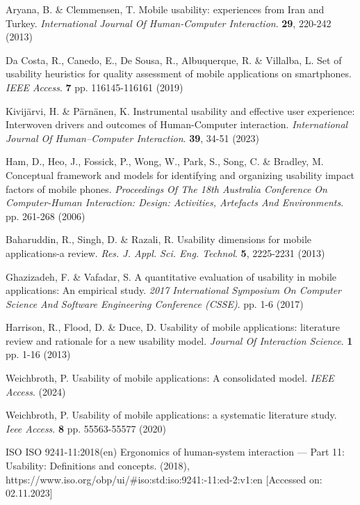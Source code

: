 \documentclass[preprint,12pt]{elsarticle}
\begin{document}
\begin{thebibliography}{99}
Aryana, B. \& Clemmensen, T. Mobile usability: experiences from Iran and Turkey. {\em International Journal Of Human-Computer Interaction}. \textbf{29}, 220-242 (2013)

Da Costa, R., Canedo, E., De Sousa, R., Albuquerque, R. \& Villalba, L. Set of usability heuristics for quality assessment of mobile applications on smartphones. {\em IEEE Access}. \textbf{7} pp. 116145-116161 (2019)

Kivijärvi, H. \& Pärnänen, K. Instrumental usability and effective user experience: Interwoven drivers and outcomes of Human-Computer interaction. {\em International Journal Of Human–Computer Interaction}. \textbf{39}, 34-51 (2023)

Ham, D., Heo, J., Fossick, P., Wong, W., Park, S., Song, C. \& Bradley, M. Conceptual framework and models for identifying and organizing usability impact factors of mobile phones. {\em Proceedings Of The 18th Australia Conference On Computer-Human Interaction: Design: Activities, Artefacts And Environments}. pp. 261-268 (2006)

Baharuddin, R., Singh, D. \& Razali, R. Usability dimensions for mobile applications-a review. {\em Res. J. Appl. Sci. Eng. Technol}. \textbf{5}, 2225-2231 (2013)

Ghazizadeh, F. \& Vafadar, S. A quantitative evaluation of usability in mobile applications: An empirical study. {\em 2017 International Symposium On Computer Science And Software Engineering Conference (CSSE)}. pp. 1-6 (2017)

Harrison, R., Flood, D. \& Duce, D. Usability of mobile applications: literature review and rationale for a new usability model. {\em Journal Of Interaction Science}. \textbf{1} pp. 1-16 (2013)

Weichbroth, P. Usability of mobile applications: A consolidated model. {\em IEEE Access}. (2024)

Weichbroth, P. Usability of mobile applications: a systematic literature study. {\em Ieee Access}. \textbf{8} pp. 55563-55577 (2020)

ISO ISO 9241-11:2018(en) Ergonomics of human-system interaction — Part 11: Usability: Definitions and concepts. (2018), https://www.iso.org/obp/ui/\#iso:std:iso:9241:-11:ed-2:v1:en [Accessed on: 02.11.2023]


\end{thebibliography}
\end{document}
